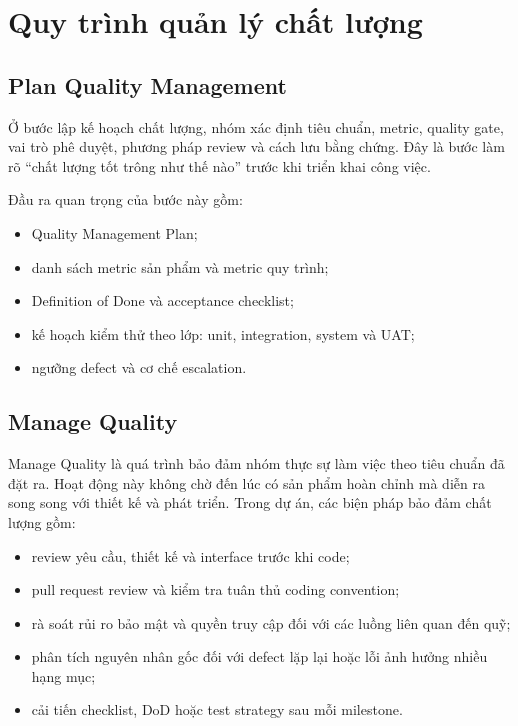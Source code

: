 
\section{Quy trình quản lý chất lượng}

\subsection{Plan Quality Management}

Ở bước lập kế hoạch chất lượng, nhóm xác định tiêu chuẩn, metric, quality gate, vai trò phê duyệt, phương pháp review và cách lưu bằng chứng. Đây là bước làm rõ ``chất lượng tốt trông như thế nào'' trước khi triển khai công việc.

Đầu ra quan trọng của bước này gồm:

\begin{itemize}
  \item Quality Management Plan;
  \item danh sách metric sản phẩm và metric quy trình;
  \item Definition of Done và acceptance checklist;
  \item kế hoạch kiểm thử theo lớp: unit, integration, system và UAT;
  \item ngưỡng defect và cơ chế escalation.
\end{itemize}

\subsection{Manage Quality}

Manage Quality là quá trình bảo đảm nhóm thực sự làm việc theo tiêu chuẩn đã đặt ra. Hoạt động này không chờ đến lúc có sản phẩm hoàn chỉnh mà diễn ra song song với thiết kế và phát triển. Trong dự án, các biện pháp bảo đảm chất lượng gồm:

\begin{itemize}
  \item review yêu cầu, thiết kế và interface trước khi code;
  \item pull request review và kiểm tra tuân thủ coding convention;
  \item rà soát rủi ro bảo mật và quyền truy cập đối với các luồng liên quan đến quỹ;
  \item phân tích nguyên nhân gốc đối với defect lặp lại hoặc lỗi ảnh hưởng nhiều hạng mục;
  \item cải tiến checklist, DoD hoặc test strategy sau mỗi milestone.
\end{itemize}

